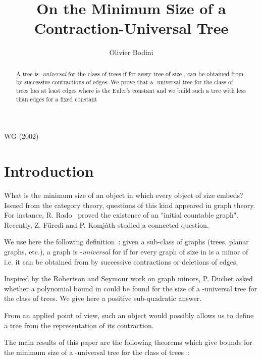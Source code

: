 \documentclass{llncs}
\begin{document}
\title{On the Minimum Size of a Contraction-Universal Tree}
\author{Olivier Bodini}
 \maketitle
\pagestyle{myheadings}  {{\sc WG
(2002)}\hfill}

\begin{abstract}

A tree  is -\textit{universal} for the class of trees
if for every tree  of size ,  can be obtained from
 by successive contractions of edges. We prove that a
-universal tree for the class of trees has at least  edges where  is the Euler's
constant and we build such a tree with less than  edges for a
fixed constant 
\end{abstract}



\section{Introduction}





What is the minimum size of an object in which every object of
size  embeds? Issued from the category theory, questions of
this kind appeared in graph theory. For instance, R. Rado~
\cite{Ra} proved the existence of an "initial countable graph".
Recently, Z. F\"{u}redi and P. Komj\`{a}th \cite{FK} studied a
connected question.

We use here the following definition~: given a sub-class  of
graphs (trees, planar graphs, etc.), a graph  is
-\textit{universal} for  if for every graph  of size 
in  is a minor of  i.e. it can be obtained from
 by successive contractions or deletions of edges.

Inspired by the Robertson and Seymour work \cite{RS} on graph
minors, P. Duchet asked whether a polynomial bound in  could be
found for the size of a -universal tree for the class of trees.
We give here a positive sub-quadratic answer.

From an applied point of view, such an object would possibly
allows us to define a tree from the representation of its
contraction.

The main results of this paper are the following theorems which
give bounds for the minimum size of a -universal tree for the
class of trees~:
\end{document}
